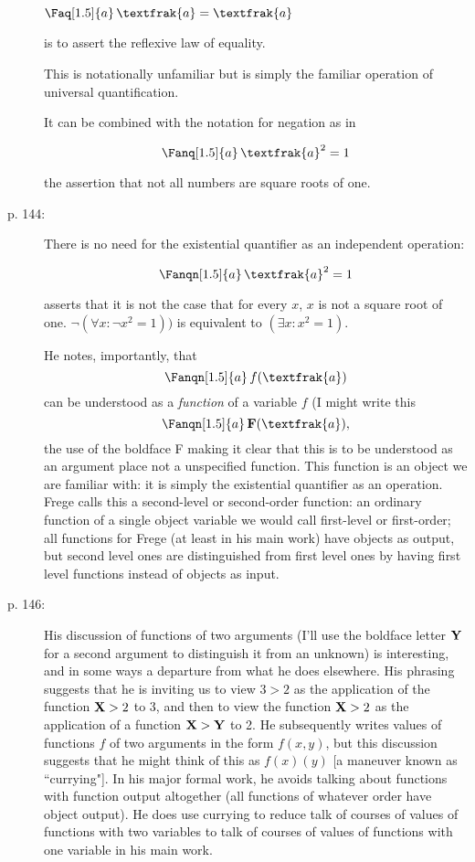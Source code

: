 \documentclass[12pt]{article}
\begin{document}
\begin{description}
$\Faq[1.5]{a} \,\textfrak{a}=\textfrak{a}$

is to assert the reflexive law of equality.

This is notationally unfamiliar but is simply the familiar operation of universal quantification.

It can be combined with the notation for negation as in

$$\Fanq[1.5]{a} \,\textfrak{a}^2=1$$

the assertion that not all numbers are square roots of one.

\item[p. 144:]  There is no need for the existential quantifier as an independent operation:

$$\Fanqn[1.5]{a} \, \textfrak{a}^2 = 1$$

asserts that it is not the case that for every $x$, $x$ is not a square root of one.  $\neg (\forall x:\neg x^2=1))$ is equivalent to $(\exists x:x^2=1)$.

He notes, importantly, that $$\Fanqn[1.5]{a} \, f(\textfrak{a})$$  can be understood as a {\em function\/} of a variable $f$ (I might write this  $$\Fanqn[1.5]{a} \, {\bf F}(\textfrak{a}),$$
the use of the boldface F making it clear that this is to be understood as an argument place not a unspecified function.  This function is an object we are familiar with:  it is simply the existential quantifier as an operation.  Frege calls this a second-level or second-order function:  an ordinary function of a single object variable we would call first-level or first-order;
all functions for Frege (at least in his main work) have objects as output, but second level ones are distinguished from first level ones by having first level functions instead of objects as input.

\item[p. 146:]  His discussion of functions of two arguments (I'll use the boldface letter $\bf Y$ for a second argument to distinguish it from an unknown) is interesting, and in some ways a departure from what he does elsewhere.  His phrasing suggests that he is inviting us to view $3>2$ as the application of the function ${\bf X}>2$ to 3, and then to view the function ${\bf X}>2$ as the application of a function ${\bf X}>{\bf Y}$ to 2.  He subsequently writes
values of functions $f$ of two arguments in the form $f(x,y)$, but this discussion suggests that he might think of this as $f(x)(y)$ [a maneuver known as ``currying"].  In his major formal work, he avoids talking about functions with function output altogether (all functions of whatever order have object output).  He does use currying to reduce talk of courses of values of functions with two variables to talk of courses of values of functions with one variable in his main work.


\end{description}
\end{document}
